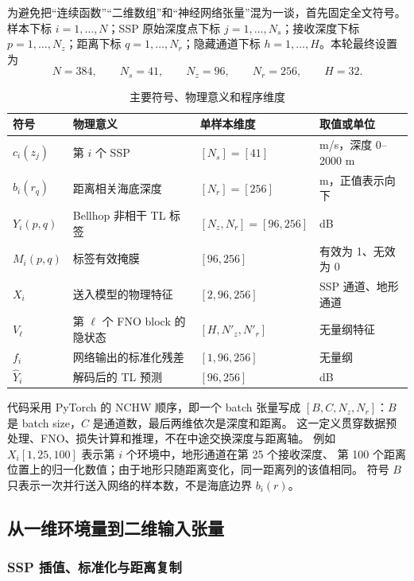 \documentclass[UTF8,11pt]{ctexart}
\begin{document}
为避免把“连续函数”“二维数组”和“神经网络张量”混为一谈，首先固定全文符号。样本下标
$i=1,\ldots,N$；SSP 原始深度点下标 $j=1,\ldots,N_s$；接收深度下标
$p=1,\ldots,N_z$；距离下标 $q=1,\ldots,N_r$；隐藏通道下标
$h=1,\ldots,H$。本轮最终设置为
\begin{equation}
  N=384,\qquad N_s=41,\qquad N_z=96,\qquad N_r=256,\qquad H=32.
\end{equation}

\begin{table}[H]
\centering
\caption{主要符号、物理意义和程序维度}
\begin{tabularx}{\textwidth}{L{2.2cm}L{3.2cm}L{3.0cm}Y}
\toprule
符号 & 物理意义 & 单样本维度 & 取值或单位 \\
\midrule
$c_i(z_j)$ & 第 $i$ 个 SSP & $[N_s]=[41]$ & m/s，深度 0--2000 m \\
$b_i(r_q)$ & 距离相关海底深度 & $[N_r]=[256]$ & m，正值表示向下 \\
$Y_i(p,q)$ & Bellhop 非相干 TL 标签 & $[N_z,N_r]=[96,256]$ & dB \\
$M_i(p,q)$ & 标签有效掩膜 & $[96,256]$ & 有效为 1、无效为 0 \\
$X_i$ & 送入模型的物理特征 & $[2,96,256]$ & SSP 通道、地形通道 \\
$V_\ell$ & 第 $\ell$ 个 FNO block 的隐状态 & $[H,N'_z,N'_r]$ & 无量纲特征 \\
$f_i$ & 网络输出的标准化残差 & $[1,96,256]$ & 无量纲 \\
$\hat Y_i$ & 解码后的 TL 预测 & $[96,256]$ & dB \\
\bottomrule
\end{tabularx}
\end{table}

代码采用 PyTorch 的 NCHW 顺序，即一个 batch 张量写成
$[B,C,N_z,N_r]$：$B$ 是 batch size，$C$ 是通道数，最后两维依次是深度和距离。
这一定义贯穿数据预处理、FNO、损失计算和推理，不在中途交换深度与距离轴。
例如 $X_i[1,25,100]$ 表示第 $i$ 个环境中，地形通道在第 25 个接收深度、
第 100 个距离位置上的归一化数值；由于地形只随距离变化，同一距离列的该值相同。
符号 $B$ 只表示一次并行送入网络的样本数，不是海底边界 $b_i(r)$。

\subsection{从一维环境量到二维输入张量}

\subsubsection{SSP 插值、标准化与距离复制}
\end{document}
